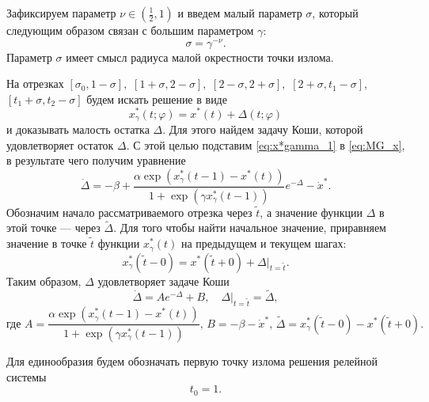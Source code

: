 Зафиксируем параметр $\nu\in(\frac{1}{2}, 1)$ и введем малый параметр $\sigma$, который следующим образом связан с большим параметром $\gamma$:  
%
\[\sigma=\gamma^{-\nu}.\]
%
Параметр $\sigma$ имеет смысл радиуса малой окрестности точки излома.

На отрезках 
$[\sigma_0, 1 - \sigma],$ 
$[1 + \sigma, 2 - \sigma],$ 
$[2 - \sigma, 2 + \sigma],$ 
$[2 + \sigma, t_1 - \sigma],$ 
$[t_1 + \sigma, t_2 - \sigma]$ 
будем искать решение в виде
%
\begin{equation}
    \label{eq:x*gamma_1}
    x^*_\gamma(t; \varphi) = x^*(t) + \Delta(t; \varphi)
\end{equation}
и доказывать малость остатка $\Delta$. Для этого найдем задачу Коши, которой удовлетворяет остаток $\Delta$. С этой целью подставим \eqref{eq:x*gamma_1} в \eqref{eq:MG_x}, в результате чего получим уравнение
%
\begin{equation*}
    \dot{\Delta} = -\beta + \frac{\alpha\exp(x_{\gamma}^*(t - 1) - x^*(t))}{1 + \exp(\gamma x_{\gamma}^*(t - 1))}e^{-\Delta}-\dot{x}^*.
\end{equation*}
%
Обозначим начало рассматриваемого отрезка через $\tilde{t}$, а значение функции $\Delta$ в этой точке --- через $\tilde{\Delta}$. Для того чтобы найти начальное значение, приравняем значение в точке $\tilde{t}$ функции $x_{\gamma}^*(t)$ на предыдущем и текущем шагах:
%
\[x_{\gamma}^*(\tilde{t} - 0) = x^*(\tilde{t} + 0)+\Delta|_{t=\tilde{t}}.\]
%
Таким образом, $\Delta$ удовлетворяет задаче Коши
\begin{equation}
        \label{eq:task_DeltaAB}
        \dot{\Delta}=A e^{-\Delta} + B,\quad \Delta|_{t=\tilde{t}}=\tilde{\Delta},
\end{equation}
%
\begin{equation}
    \label{AB_eq:x*gamma_1}
\text{где } A = \frac{\alpha\exp(x_{\gamma}^*(t - 1) - x^*(t))}{1+\exp(\gamma x_{\gamma}^*(t - 1))},\, 
B = -\beta-\dot{x}^*,\, 
\tilde{\Delta}=x_{\gamma}^*(\tilde{t} - 0) - x^*(\tilde{t} + 0).
\end{equation}

Для единообразия будем обозначать первую точку излома решения релейной системы
\begin{equation}
	\label{eq:t0:ch1}
	t_0 = 1.
\end{equation}

